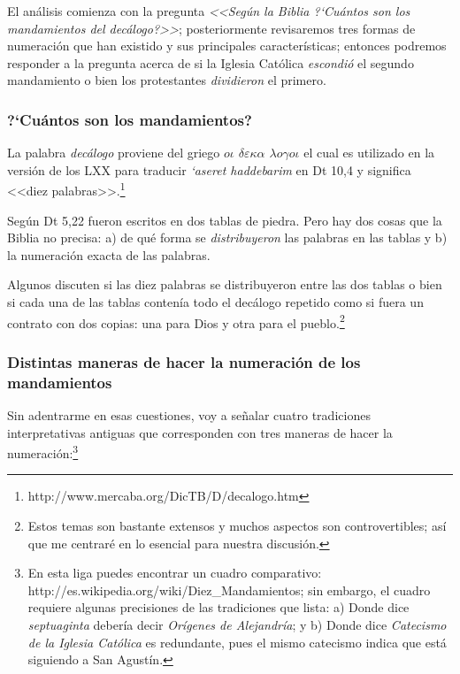 \documentclass{article}
\begin{document}
\noindent
El an\'alisis comienza con la pregunta \emph{<<Seg\'un la Biblia ?`Cu\'antos son los mandamientos del dec\'alogo?>>}; posteriormente revisaremos tres formas de numeraci\'on que han existido y sus principales caracter\'{i}sticas; entonces podremos responder a la pregunta acerca de si la Iglesia Cat\'olica \emph{escondi\'o} el segundo mandamiento o bien los protestantes \emph{dividieron} el primero.

\subsubsection{?`Cu\'antos son los mandamientos?}

La palabra \emph{dec\'alogo} proviene del griego \emph{$o \iota$ $ \delta\varepsilon\kappa\alpha$ $\lambda o \gamma o \iota$} el cual es utilizado en la versi\'on de los LXX para traducir \emph{{\lq}aseret haddebarim} en Dt 10,4 y significa <<diez palabras>>.\footnote{http://www.mercaba.org/DicTB/D/decalogo.htm}

Seg\'un Dt 5,22 fueron escritos en dos tablas de piedra. Pero hay dos cosas que la Biblia no precisa: a) de qu\'e forma se \emph{distribuyeron} las palabras en las tablas y b) la numeraci\'on exacta de las palabras.

Algunos discuten si las diez palabras se distribuyeron entre las dos tablas o bien si cada una de las tablas conten\'{i}a todo el dec\'alogo repetido como si fuera un contrato con dos copias: una para Dios y otra para el pueblo.\footnote{Estos temas son bastante extensos y muchos aspectos son controvertibles; as\'{i} que me centrar\'e en lo esencial para nuestra discusi\'on.}

\subsubsection{Distintas maneras de hacer la numeraci\'on de los mandamientos}

Sin adentrarme en esas cuestiones, voy a se\~nalar cuatro tradiciones interpretativas antiguas que corresponden con tres maneras de hacer la numeraci\'on:\footnote{En esta liga puedes encontrar un cuadro comparativo: http://es.wikipedia.org/wiki/Diez\_Mandamientos; sin embargo, el cuadro requiere algunas precisiones de las tradiciones que lista: a) Donde dice \emph{septuaginta} deber\'{i}a decir \emph{Or\'{i}genes de Alejandr\'{i}a}; y b) Donde dice \emph{Catecismo de la Iglesia Cat\'olica} es redundante, pues el mismo catecismo indica que est\'a siguiendo a San Agust\'{i}n.}
\end{document}
